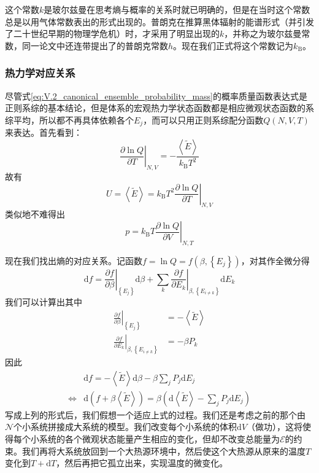 \documentclass[main.tex]{subfiles}
\begin{document}
这个常数$k$是玻尔兹曼在思考熵与概率的关系时\cite{Sharp2015}就已明确的，但是在当时这个常数总是以用气体常数表出的形式出现的。普朗克在推算黑体辐射的能谱形式（并引发了二十世纪早期的物理学危机）时\cite{Planck1901}，才采用了明显出现的$k$，并称之为玻尔兹曼常数，同一论文中还连带提出了的普朗克常数$h$。现在我们正式将这个常数记为$k_\text{B}$。

\subsubsection{热力学对应关系}
尽管式\eqref{eq:V.2_canonical_ensemble_probability_mass}的概率质量函数表达式是正则系综的基本结论，但是体系的宏观热力学状态函数都是相应微观状态函数的系综平均，所以都不再具体依赖各个$E_j$，而可以只用正则系综配分函数$Q\left(N,V,T\right)$来表达。首先看到：
\[\left.\frac{\partial\ln Q}{\partial T}\right|_{N,V}=-\frac{\left\langle\tilde{E}\right\rangle}{k_\text{B}T^2}\]
故有
\[U=\left\langle\tilde{E}\right\rangle=k_\text{B}T^2\left.\frac{\partial\ln Q}{\partial T}\right|_{N,V}\]
类似地不难得出
\[p=k_\text{B}T\left.\frac{\partial\ln Q}{\partial V}\right|_{N,T}\]

现在我们找出熵的对应关系。记函数$f=\ln Q=f\left(\beta,\left\{E_j\right\}\right)$，对其作全微分得
\[\mathrm{d}f=\left.\frac{\partial f}{\partial\beta}\right|_{\left\{E_j\right\}}\mathrm{d}\beta+\sum_k\left.\frac{\partial f}{\partial E_k}\right|_{\beta,\left\{E_{i\neq k}\right\}}\mathrm{d}E_k\]
我们可以计算出其中
\begin{align*}
    \left.\frac{\partial f}{\partial\beta}\right|_{\left\{E_j\right\}}              & =-\left\langle\tilde{E}\right\rangle \\
    \left.\frac{\partial f}{\partial E_k}\right|_{\beta,\left\{E_{i\neq k}\right\}} & =-\beta P_k
\end{align*}
因此
\begin{align*}
                    & \mathrm{d}f=-\left\langle\tilde{E}\right\rangle\mathrm{d}\beta-\beta\sum_jP_j\mathrm{d}E_j                                                             \\
    \Leftrightarrow & \mathrm{d}\left(f+\beta\left\langle\tilde{E}\right\rangle\right)=\beta\left(\mathrm{d}\left\langle\tilde{E}\right\rangle-\sum_jP_j\mathrm{d}E_j\right)
\end{align*}
写成上列的形式后，我们假想一个适应上式的过程。我们还是考虑之前的那个由$\mathcal{N}$个小系统拼接成大系统的模型。我们改变每个小系统的体积$\mathrm{d}V$（做功），这将使得每个小系统的各个微观状态能量产生相应的变化，但却不改变总能量为$\mathcal{E}$的约束。我们再将大系统放回到一个大热源环境中，然后使这个大热源从原来的温度$T$变化到$T+\mathrm{d}T$，然后再把它孤立出来，实现温度的微变化。
\end{document}
